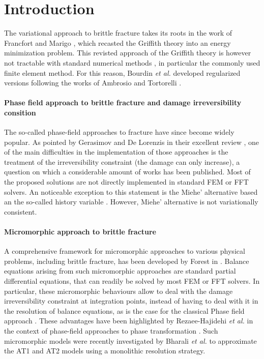 \section{Introduction}

The variational approach to brittle fracture takes its roots in the work of
Francfort and Marigo \cite{francfort_revisiting_1998,francfort_vers_2002},
which recasted the Griffith theory into an energy
minimization problem.
This revisted approach of the Griffith theory is however not tractable
with standard numerical methods
\cite{bourdin_numerical_2000, chambolle_approximation_2018}, in particular
the commonly used finite element method. For this reason, Bourdin \textit{et
al.} developed regularized versions \cite{bourdin_numerical_2000} following
the works of Ambrosio and Tortorelli \cite{ambrosio_approximation_1990}.

\paragraph{Phase field approach to brittle fracture and damage irreversibility consition}

The so-called phase-field approaches to fracture have since become
widely popular. As pointed by Gerasimov and De Lorenzis in their
excellent review \cite{gerasimov_numerical_2020}, one of the main
difficulties in the implementation of those approaches is the treatment
of the irreversibility constraint (the damage can only increase), a
question on which a considerable amount of works has been published.
Most of the proposed solutions are not directly implemented in standard
FEM or FFT solvers. An noticeable exception to this statement is the
Miehe' alternative based an the so-called history variable
\cite{miehe_phase_2010}. However, Miehe' alternative is not variationally
consistent.

\paragraph{Micromorphic approach to brittle fracture}

A comprehensive framework for 
micromorphic approaches to various physical problems,
including brittle fracture, has been developed by Forest in
\cite{forest_micromorphic_2009, forest_nonlinear_2016}.
Balance equations arising from
such micromorphic approaches are
standard partial differential equations, that can readily be solved by
most FEM or FFT solvers.
In particular, these micromorphic behaviours allow to
deal with the damage irreversibility constraint at integration points,
instead of having to deal with it in the resolution of balance equations,
as is the case for the classical Phase field approach \cite{gerasimov_numerical_2020}. These
advantages have been highlighted by Rezaee-Hajidehi \textit{et al.} in the
context of phase-field approaches to phase transformation
\cite{rezaee-hajidehi_micromorphic_2021}.
%
%
%
Such micromorphic models were recently investigated by Bharali \textit{et al.}
\cite{bharali_computational_2021} to approximate the AT1 and AT2 models
using a monolithic resolution strategy.


